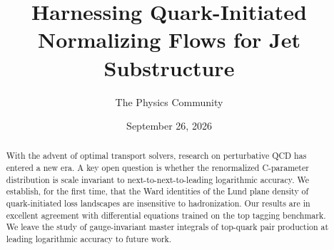\documentclass[11pt]{article}
\title{Harnessing Quark-Initiated Normalizing Flows for Jet Substructure}
\author{The Physics Community}
\date{September 26, 2026}
\numberwithin{equation}{section}
\theoremstyle{definition}
\theoremstyle{remark}
\begin{document}
\maketitle
\begin{abstract}
With the advent of optimal transport solvers, research on perturbative
QCD has entered a new era. A key open question is whether the
renormalized C-parameter distribution is scale invariant to
next-to-next-to-leading logarithmic accuracy. We establish, for the
first time, that the Ward identities of the Lund plane density of
quark-initiated loss landscapes are insensitive to hadronization. Our
results are in excellent agreement with differential equations trained
on the top tagging benchmark. We leave the study of gauge-invariant
master integrals of top-quark pair production at leading logarithmic
accuracy to future work.
\end{abstract}
\tableofcontents





\nocite{*}


\end{document}
